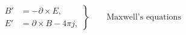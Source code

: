 \documentclass{article}
\begin{document}

\begin{equation*}
\left.\begin{aligned}
B'&=-\partial\times E,\\
E'&=\partial\times B - 4\pi j,
\end{aligned}
\right\}
\qquad \text{Maxwell's equations}
\end{equation*}

\weirdmacro
\end{document}
